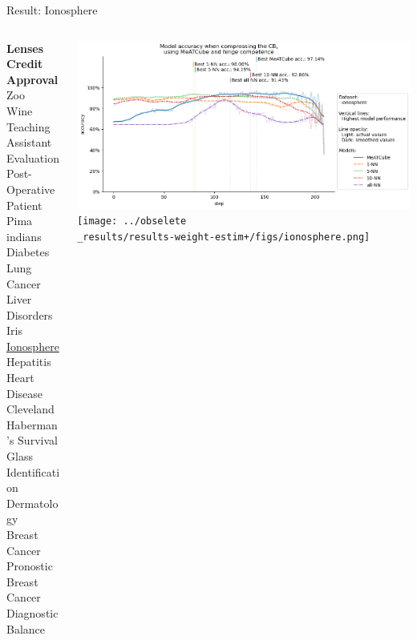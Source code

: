 \documentclass[]{beamer}
\begin{document}
\begin{frame}{Result: Ionosphere}
    \begin{columns}
        \begin{column}{.3\textwidth}
            {\smaller\smaller\smaller
            \textbf{Lenses} \\
            \textbf{Credit Approval} \\
            Zoo \\
            Wine \\
            Teaching Assistant Evaluation \\
            Post-Operative Patient \\
            Pima indians Diabetes \\
            Lung Cancer \\
            Liver Disorders \\
            Iris \\
            \underline{Ionosphere} \\
            Hepatitis \\
            Heart Disease Cleveland \\
            Haberman's Survival \\
            Glass Identification \\
            Dermatology \\
            Breast Cancer Pronostic \\
            Breast Cancer Diagnostic \\
            Balance\\
            ~}
        \end{column}
        \begin{column}{.7\textwidth}
            \includegraphics[width=\textwidth]{../results-no-sim-tuning+/figs/ionosphere.png}
            \texttt{[image: ../obselete\\\_results/results-weight-estim+/figs/ionosphere.png]}
        \end{column}
    \end{columns}
\end{frame}
\end{document}
